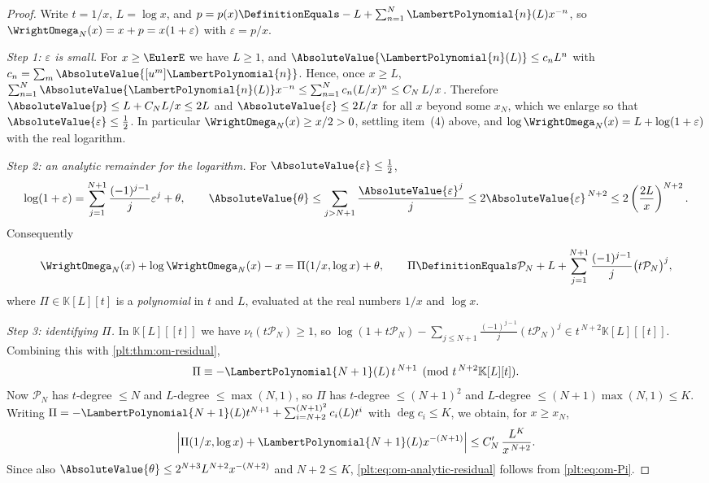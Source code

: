 \documentclass[11pt,oneside]{article}
\theoremstyle{plain}
\theoremstyle{definition}
\theoremstyle{remark}
\newcommand{\K}{\mathbb{K}}
\newcommand{\ordt}{\nu_{t}}                              %
\newcommand{\LamP}[1]{\LambertPolynomial{#1}}
\begin{document}
\begin{proof}
Write \(t=1/x\), \(L=\log x\), and
\(p=p(x)\DefinitionEquals-L+\sum_{n=1}^{N}\LamP{n}(L)x^{-n}\), so
\(\WrightOmega_N(x)=x+p=x(1+\varepsilon)\) with \(\varepsilon=p/x\).

\emph{Step 1: \(\varepsilon\) is small.}  For \(x\ge\EulerE\) we have
\(L\ge1\), and \(\AbsoluteValue{\LamP{n}(L)}\le c_nL^{n}\) with
\(c_n=\sum_{m}\AbsoluteValue{[u^{m}]\LamP{n}}\).  Hence, once \(x\ge L\),
\(\sum_{n=1}^{N}\AbsoluteValue{\LamP{n}(L)}x^{-n}\le\sum_{n=1}^{N}c_n(L/x)^{n}\le C_N\,L/x\).
Therefore \(\AbsoluteValue{p}\le L+C_NL/x\le2L\) and
\(\AbsoluteValue{\varepsilon}\le2L/x\) for all \(x\) beyond some \(x_N\),
which we enlarge so that \(\AbsoluteValue{\varepsilon}\le\tfrac12\).  In
particular \(\WrightOmega_N(x)\ge x/2>0\), settling item~(4) above, and
\(\log\WrightOmega_N(x)=L+\log(1+\varepsilon)\) with the real logarithm.

\emph{Step 2: an analytic remainder for the logarithm.}  For
\(\AbsoluteValue{\varepsilon}\le\tfrac12\),
\[
 \log(1+\varepsilon)
 =\sum_{j=1}^{N+1}\frac{(-1)^{j-1}}{j}\varepsilon^{j}+\theta,
 \qquad
 \AbsoluteValue{\theta}
 \le\sum_{j>N+1}\frac{\AbsoluteValue{\varepsilon}^{j}}{j}
 \le2\AbsoluteValue{\varepsilon}^{\,N+2}
 \le2\left(\frac{2L}{x}\right)^{N+2}.
\]
Consequently
\begin{equation}\label{plt:eq:om-Pi}
 \WrightOmega_N(x)+\log\WrightOmega_N(x)-x
 =\Pi(1/x,\log x)+\theta,
 \qquad
 \Pi\DefinitionEquals
 \mathcal P_N+L+\sum_{j=1}^{N+1}\frac{(-1)^{j-1}}{j}\bigl(t\mathcal P_N\bigr)^{j},
\end{equation}
where \(\Pi\in\K[L][t]\) is a \emph{polynomial} in \(t\) and \(L\), evaluated
at the real numbers \(1/x\) and \(\log x\).

\emph{Step 3: identifying \(\Pi\).}  In \(\K[L][[t]]\) we have
\(\ordt(t\mathcal P_N)\ge1\), so
\(\log(1+t\mathcal P_N)-\sum_{j\le N+1}\frac{(-1)^{j-1}}{j}(t\mathcal P_N)^{j}
\in t^{\,N+2}\K[L][[t]]\).  Combining this with
\cref{plt:thm:om-residual},
\[
 \Pi\equiv-\LamP{N+1}(L)\,t^{\,N+1}\pmod{t^{\,N+2}\K[L][t]} .
\]
Now \(\mathcal P_N\) has \(t\)-degree \(\le N\) and \(L\)-degree
\(\le\max(N,1)\), so \(\Pi\) has \(t\)-degree \(\le(N+1)^{2}\) and
\(L\)-degree \(\le(N+1)\max(N,1)\le K\).  Writing
\(\Pi=-\LamP{N+1}(L)t^{N+1}+\sum_{i=N+2}^{(N+1)^{2}}c_i(L)t^{i}\) with
\(\deg c_i\le K\), we obtain, for \(x\ge x_N\),
\[
 \Bigl|\Pi(1/x,\log x)+\LamP{N+1}(L)x^{-(N+1)}\Bigr|
 \le C_N'\,\frac{L^{K}}{x^{\,N+2}} .
\]
Since also \(\AbsoluteValue{\theta}\le2^{N+3}L^{N+2}x^{-(N+2)}\) and
\(N+2\le K\), \eqref{plt:eq:om-analytic-residual} follows from
\eqref{plt:eq:om-Pi}.


\end{proof}
\end{document}
